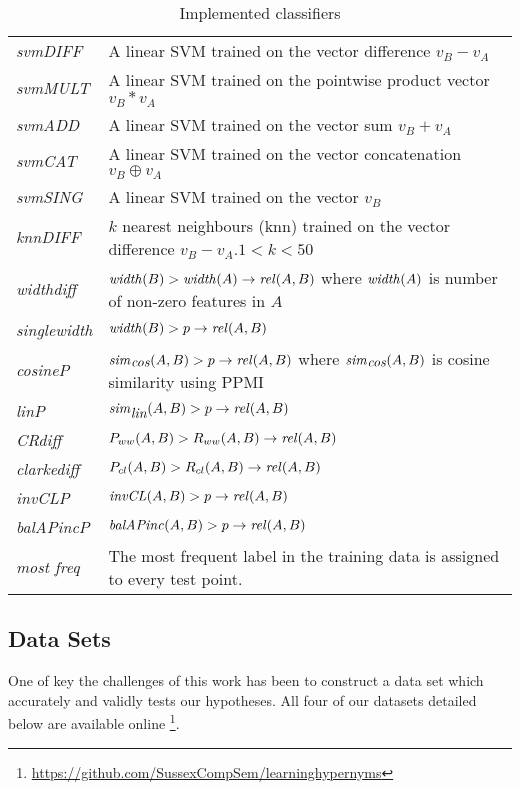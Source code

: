 \documentclass[11pt]{article}
\newcommand\invCL[1]{\mbox{\em invCL\/}(#1)}
\newcommand\simcos[1]{\mbox{\em sim\/}_{\mbox{\em cos}}(#1)}
\newcommand\simlin[1]{\mbox{\em sim\/}_{\mbox{\em lin}}(#1)}
\newcommand\width[1]{\mbox{\em width\/}(#1)}
\newcommand\balapinc[1]{\mbox{\em balAPinc\/}(#1)}
\newcommand\rel[1]{\mbox{\em rel\/}(#1)}
\begin{document}
\begin{table*}[ht]
\centering
\begin{tabular}{|l|p{14cm}|}
\hline
\emph{svmDIFF}& A linear SVM trained on the vector difference $v_B - v_A$\\
\emph{svmMULT}& A linear SVM trained on the pointwise product vector $v_B * v_A$\\
\emph{svmADD}& A linear SVM trained on the vector sum $v_B + v_A$\\
\emph{svmCAT}& A linear SVM trained on the vector concatenation $v_B\oplus v_A$\\
\emph{svmSING}& A linear SVM trained on the vector $v_B$\\
\emph{knnDIFF}& $k$ nearest neighbours (knn) trained on the vector difference $v_B - v_A$.$1< k<50$\\
\hline
\emph{widthdiff}& $\width{B} > \width{A} \rightarrow\rel{A,B}$  where $\width{A}$ is  number of non-zero features in $A$\\
\emph{singlewidth}& $\width{B} > p \rightarrow \rel{A,B}$\\
\emph{cosineP}& $\simcos{A,B} > p \rightarrow\rel{A,B}$ where $\simcos{A,B}$ is cosine similarity using PPMI\\
\emph{linP}&$\simlin{A,B} > p \rightarrow\rel{A,B}$ \cite{Lin1998}\\
\emph{CRdiff}& $P_{ww}(A,B) > R_{ww}(A,B) \rightarrow\rel{A,B}$  \cite{Weeds2004}\\
\emph{clarkediff}&$P_{cl}(A,B) > R_{cl}(A,B) \rightarrow\rel{A,B}$  \cite{Clarke:09}\\
\emph{invCLP}&$\invCL{A,B} > p \rightarrow\rel{A,B}$  \cite{Lenci2012}\\
\emph{balAPincP}&$\balapinc{A,B} > p \rightarrow\rel{A,B}$ \cite{Kotlerman2010}\\
\emph{most freq}&The most frequent label in the training data is assigned to every test point.\\
\hline
\end{tabular}
\caption{Implemented classifiers}
\label{table:classifiers}
\end{table*}

\subsection{Data Sets}
\label{sect:data}

One of key the challenges of this work has been to construct a data set which accurately and validly tests our hypotheses.  All four of our datasets detailed below are available online \footnote{\url{https://github.com/SussexCompSem/learninghypernyms}}.
\end{document}
